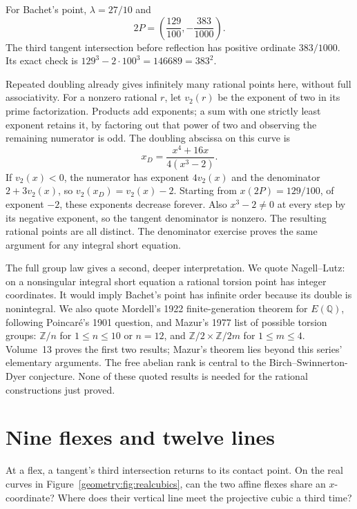 For Bachet's point, $\lambda=27/10$ and
\[
2P=\left(\frac{129}{100},-\frac{383}{1000}\right).
\]
The third tangent intersection before reflection has positive ordinate $383/1000$. Its exact check is $129^3-2\cdot100^3=146689=383^2$.

Repeated doubling already gives infinitely many rational points here, without full associativity. For a nonzero rational $r$, let $v_2(r)$ be the exponent of two in its prime factorization. Products add exponents; a sum with one strictly least exponent retains it, by factoring out that power of two and observing the remaining numerator is odd. The doubling abscissa on this curve is
\[
x_D=\frac{x^4+16x}{4(x^3-2)}.
\]
If $v_2(x)<0$, the numerator has exponent $4v_2(x)$ and the denominator $2+3v_2(x)$, so $v_2(x_D)=v_2(x)-2$. Starting from $x(2P)=129/100$, of exponent $-2$, these exponents decrease forever. Also $x^3-2\ne0$ at every step by its negative exponent, so the tangent denominator is nonzero. The resulting rational points are all distinct. The denominator exercise proves the same argument for any integral short equation.

\begin{remark}
The full group law gives a second, deeper interpretation. We quote Nagell--Lutz: on a nonsingular integral short equation a rational torsion point has integer coordinates. It would imply Bachet's point has infinite order because its double is nonintegral. We also quote Mordell's 1922 finite-generation theorem for $E(\mathbb Q)$, following Poincar\'e's 1901 question, and Mazur's 1977 list of possible torsion groups: $\mathbb Z/n$ for $1\le n\le10$ or $n=12$, and $\mathbb Z/2\times\mathbb Z/2m$ for $1\le m\le4$. Volume~13 proves the first two results; Mazur's theorem lies beyond this series' elementary arguments. The free abelian rank is central to the Birch--Swinnerton-Dyer conjecture. None of these quoted results is needed for the rational constructions just proved.
\end{remark}

\section{Nine flexes and twelve lines}

\begin{think}
At a flex, a tangent's third intersection returns to its contact point. On the real curves in Figure~\ref{geometry:fig:realcubics}, can the two affine flexes share an $x$-coordinate? Where does their vertical line meet the projective cubic a third time?
\end{think}

